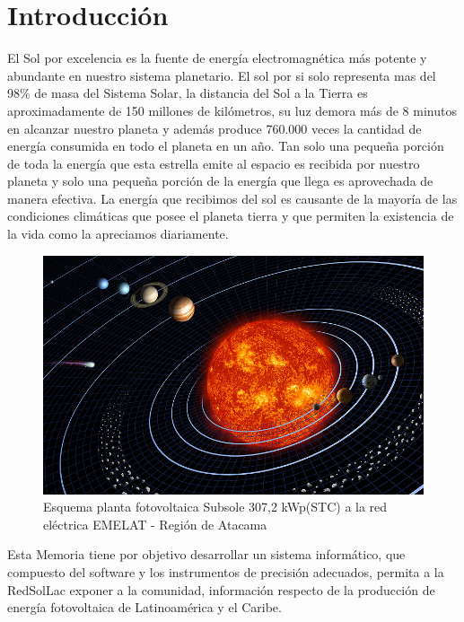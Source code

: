 \chapter{Introducción}
\label{ch:introduccion}

El Sol por excelencia es la fuente de energía electromagnética más potente y abundante en nuestro sistema planetario. El sol por si solo representa mas del 98\% de masa del Sistema Solar, la distancia del Sol a la Tierra es aproximadamente de 150 millones de kilómetros, su luz demora más de 8 minutos en alcanzar nuestro planeta y además produce 760.000 veces la cantidad de energía consumida en todo el planeta en un año. Tan solo una pequeña porción de toda la energía que esta estrella emite al espacio es recibida por nuestro planeta y solo una pequeña porción de la energía que llega es aprovechada de manera efectiva. La energía que recibimos del sol es causante de la mayoría de las condiciones climáticas que posee el planeta tierra y que permiten la existencia de la vida como la apreciamos diariamente.\\

\begin{figure}[h!]
        \centering
        \includegraphics[scale=0.4]{images/solarSis}
        \caption{\tiny Esquema planta fotovoltaica Subsole 307,2 kWp(STC) a la red eléctrica EMELAT - Región de Atacama}
\end{figure}

Esta Memoria tiene por objetivo desarrollar un sistema informático, que compuesto del software y los instrumentos de precisión adecuados, permita a la RedSolLac exponer a la comunidad, información respecto de la producción de energía fotovoltaica de Latinoamérica y el Caribe.\\ 
	
